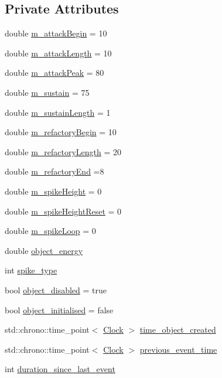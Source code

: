 \subsection*{Private Attributes}
\begin{DoxyCompactItemize}
\item 
double \mbox{\hyperlink{classSpike_af683cd1e0da2d4310da1d0bb723dc42b}{m\+\_\+attack\+Begin}} = 10
\item 
double \mbox{\hyperlink{classSpike_ad3a40048454bb37ad94e3c06069c77d5}{m\+\_\+attack\+Length}} = 10
\item 
double \mbox{\hyperlink{classSpike_a052650828271cd24a9709a832faf42b3}{m\+\_\+attack\+Peak}} = 80
\item 
double \mbox{\hyperlink{classSpike_a11d8945cda206677a7adb5571647a914}{m\+\_\+sustain}} = 75
\item 
double \mbox{\hyperlink{classSpike_a48b134667f3825716ded6966f5f37d10}{m\+\_\+sustain\+Length}} = 1
\item 
double \mbox{\hyperlink{classSpike_a6b37740d10e157844a2f4ee3a108e3ad}{m\+\_\+refactory\+Begin}} = 10
\item 
double \mbox{\hyperlink{classSpike_af1ecee046a275bfa13b663a8bc4722be}{m\+\_\+refactory\+Length}} = 20
\item 
double \mbox{\hyperlink{classSpike_a8dd4a3bc280a171e4c7ea23b85b43649}{m\+\_\+refactory\+End}} =8
\item 
double \mbox{\hyperlink{classSpike_a6a060f633f9abbeddf66f9d4e96961e7}{m\+\_\+spike\+Height}} = 0
\item 
double \mbox{\hyperlink{classSpike_a62bf030de52397708ef944d41e95398c}{m\+\_\+spike\+Height\+Reset}} = 0
\item 
double \mbox{\hyperlink{classSpike_a74fa438d3749330d86a3f0a90848a5bc}{m\+\_\+spike\+Loop}} = 0
\item 
double \mbox{\hyperlink{classSpike_ab30604e73d58882c56bb51272595e3e5}{object\+\_\+energy}}
\item 
int \mbox{\hyperlink{classSpike_a64297f01535f97c833eb740082830daf}{spike\+\_\+type}}
\item 
bool \mbox{\hyperlink{classSpike_a25760759b2d19a819feab8d27f5f9bfa}{object\+\_\+disabled}} = true
\item 
bool \mbox{\hyperlink{classSpike_ad700142996616c7cbc302baad6398e82}{object\+\_\+initialised}} = false
\item 
std\+::chrono\+::time\+\_\+point$<$ \mbox{\hyperlink{universe_8h_a0ef8d951d1ca5ab3cfaf7ab4c7a6fd80}{Clock}} $>$ \mbox{\hyperlink{classSpike_ae9e73c1745176138c2f2474c4dfdf89e}{time\+\_\+object\+\_\+created}}
\item 
std\+::chrono\+::time\+\_\+point$<$ \mbox{\hyperlink{universe_8h_a0ef8d951d1ca5ab3cfaf7ab4c7a6fd80}{Clock}} $>$ \mbox{\hyperlink{classSpike_adee91141c43f3507017abd53cdcdab08}{previous\+\_\+event\+\_\+time}}
\item 
int \mbox{\hyperlink{classSpike_a572287432bfe6202f85b2dd1822715c1}{duration\+\_\+since\+\_\+last\+\_\+event}}
\end{DoxyCompactItemize}
